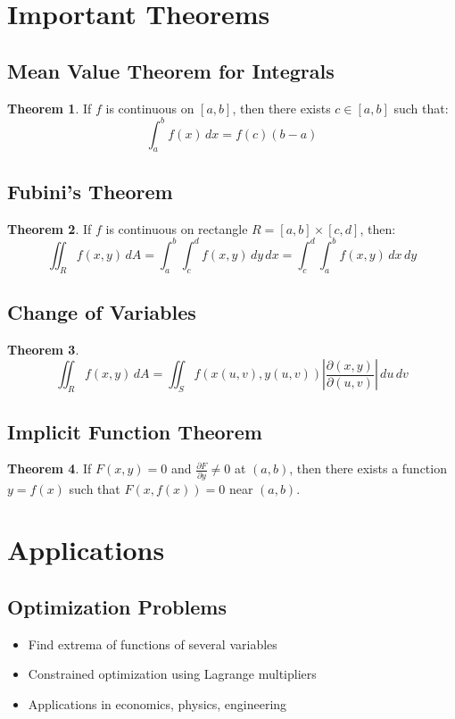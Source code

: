 \documentclass[11pt]{article}
\theoremstyle{definition}
\newtheorem{theorem}{Theorem}[section]
\begin{document}
\section{Important Theorems}

\subsection{Mean Value Theorem for Integrals}
\begin{theorem}
If $f$ is continuous on $[a,b]$, then there exists $c \in [a,b]$ such that:
$$\int_a^b f(x) \, dx = f(c)(b-a)$$
\end{theorem}

\subsection{Fubini's Theorem}
\begin{theorem}
If $f$ is continuous on rectangle $R = [a,b] \times [c,d]$, then:
$$\iint_R f(x,y) \, dA = \int_a^b \int_c^d f(x,y) \, dy \, dx = \int_c^d \int_a^b f(x,y) \, dx \, dy$$
\end{theorem}

\subsection{Change of Variables}
\begin{theorem}
$$\iint_R f(x,y) \, dA = \iint_S f(x(u,v), y(u,v)) \left|\frac{\partial(x,y)}{\partial(u,v)}\right| \, du \, dv$$
\end{theorem}

\subsection{Implicit Function Theorem}
\begin{theorem}
If $F(x,y) = 0$ and $\frac{\partial F}{\partial y} \neq 0$ at $(a,b)$, then there exists a function $y = f(x)$ such that $F(x,f(x)) = 0$ near $(a,b)$.
\end{theorem}

\section{Applications}

\subsection{Optimization Problems}
\begin{itemize}
    \item Find extrema of functions of several variables
    \item Constrained optimization using Lagrange multipliers
    \item Applications in economics, physics, engineering
\end{itemize}
\end{document}

